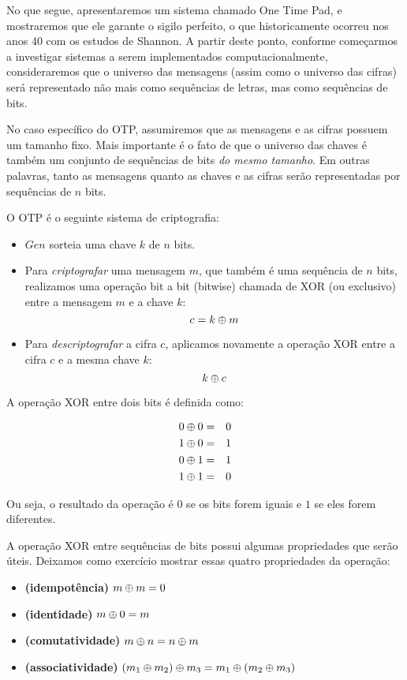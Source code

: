 No que segue, apresentaremos um sistema chamado One Time Pad, e mostraremos que ele garante o sigilo perfeito, o que historicamente ocorreu nos anos 40 com os estudos de Shannon.
A partir deste ponto, conforme começarmos a investigar sistemas a serem implementados computacionalmente, consideraremos que o universo das mensagens (assim como o universo das cifras) será representado não mais como sequências de letras, mas como sequências de bits.

No caso específico do OTP, assumiremos que as mensagens e as cifras possuem um tamanho fixo.
Mais importante é o fato de que o universo das chaves é também um conjunto de sequências de bits {\em do mesmo tamanho}.
Em outras palavras, tanto as mensagens quanto as chaves e as cifras serão representadas por sequências de $n$ bits.

O OTP é o seguinte sistema de criptografia:
\begin{itemize}
\item $Gen$ sorteia uma chave $k$ de $n$ bits.
\item Para {\em criptografar} uma mensagem $m$, que também é uma sequência de $n$ bits, realizamos uma operação bit a bit (bitwise) chamada de XOR (ou exclusivo) entre a mensagem $m$ e a chave $k$:
  \begin{displaymath}
    c = k \oplus m
  \end{displaymath}
\item Para {\em descriptografar} a cifra $c$, aplicamos novamente a operação XOR entre a cifra $c$ e a mesma chave $k$:
  \begin{displaymath}
    k \oplus c
  \end{displaymath}
\end{itemize}

A operação XOR entre dois bits é definida como:

\begin{eqnarray*}
  0 \oplus 0 & = & 0\\
  1 \oplus 0 & = & 1\\
  0 \oplus 1 & = & 1\\
  1 \oplus 1 & = & 0
\end{eqnarray*}

Ou seja, o resultado da operação é $0$ se os bits forem iguais e $1$ se eles forem diferentes.

A operação XOR entre sequências de bits possui algumas propriedades que serão úteis.
Deixamos como exercício mostrar essas quatro propriedades da operação:

\begin{itemize}
\item[] {\bf (idempotência)} $m \oplus m = 0$
\item[] {\bf (identidade)} $m \oplus 0 = m$
\item[] {\bf (comutatividade)} $m \oplus n = n \oplus m$
\item[] {\bf (associatividade)} $(m_1 \oplus m_2) \oplus m_3 = m_1 \oplus (m_2 \oplus m_3)$
\end{itemize}

